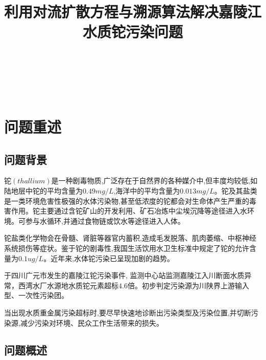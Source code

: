 \documentclass{whutmod}
\title{利用对流扩散方程与溯源算法解决嘉陵江水质铊污染问题}
\begin{document}
	
	\maketitle
	
	\begin{abstract}

   ~\\

   ~\\
   

   ~\\
   

   ~\\
   

  
		\keywords{\quad  \quad  \quad  }
		
	\end{abstract}
	
	\tableofcontents
	\newpage	%
	
	\section{问题重述}
	\subsection{问题背景}

	铊$(thallium)$是一种剧毒物质,广泛存在于自然界的各种媒介中,但丰度均较低,如陆地层中铊的平均含量为$0.49mg/L$,海洋中的平均含量为$0.013mg/L$。铊及其盐类是一类环境危害性极强的水体污染物,甚至低浓度的铊都会对生命体产生严重的毒害作用。铊主要通过含铊矿山的开发利用、矿石冶炼中尘埃沉降等途径进入水环境。可参与水循环,并通过食物链或饮水等途径进入人体\parencite{liu2019treatment}。
	
	铊盐类化学物会在骨髓、肾脏等器官内蓄积,造成毛发脱落、肌肉萎缩、中枢神经系统损伤等症状。鉴于铊的剧毒性,我国生活饮用水卫生标准中规定了铊的允许含量为$0.1ug/L$。近年来,水体铊污染已呈现加剧的趋势。
	
	于四川广元市发生的嘉陵江铊污染事件, 监测中心站监测嘉陵江入川断面水质异常，西湾水厂水源地水质铊元素超标$4.6$倍。初步判定污染源为川陕界上游输入型、一次性污染团。
	
	当出现水质重金属污染超标时,要尽早快速地诊断出污染类型及污染位置,并切断污染源,减少污染对环境、民众工作生活带来的损失。
	
	\subsection{问题概述}
	
\end{document}
